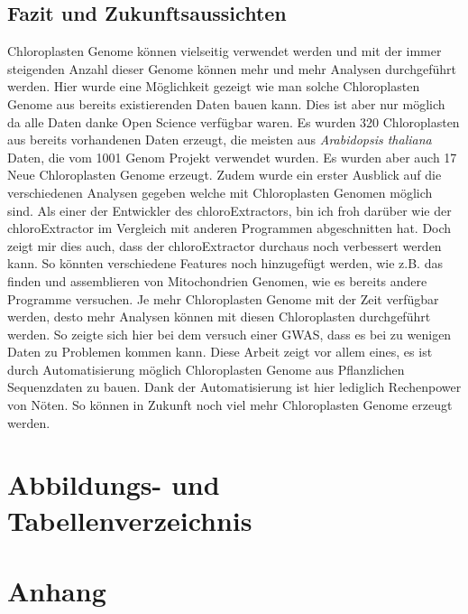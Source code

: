 \documentclass{scrartcl}
\begin{document}
\subsection{Fazit und Zukunftsaussichten}
\label{sec-5-8}
Chloroplasten Genome können vielseitig verwendet werden und mit der immer steigenden Anzahl dieser Genome können mehr und mehr Analysen durchgeführt werden. Hier wurde eine Möglichkeit gezeigt wie man solche Chloroplasten Genome
aus bereits existierenden Daten bauen kann. Dies ist aber nur möglich da alle Daten danke Open Science verfügbar waren. Es wurden 320 Chloroplasten aus bereits vorhandenen Daten erzeugt, die meisten aus \emph{Arabidopsis thaliana}
Daten, die vom 1001 Genom Projekt verwendet wurden. Es wurden aber auch 17 Neue Chloroplasten Genome erzeugt. Zudem wurde ein erster Ausblick auf die verschiedenen Analysen gegeben welche mit Chloroplasten Genomen möglich sind.
Als einer der Entwickler des chloroExtractors, bin ich froh darüber wie der chloroExtractor im Vergleich mit anderen Programmen abgeschnitten hat. Doch zeigt mir dies auch, dass der chloroExtractor durchaus noch verbessert 
werden kann.
So könnten verschiedene Features noch hinzugefügt werden, wie z.B. das finden und assemblieren von Mitochondrien Genomen, wie es bereits andere Programme versuchen. Je mehr Chloroplasten Genome mit der Zeit verfügbar werden, desto 
mehr Analysen können mit diesen Chloroplasten durchgeführt werden. So zeigte sich hier bei dem versuch einer GWAS, dass es bei zu wenigen Daten zu Problemen kommen kann. 
Diese Arbeit zeigt vor allem eines, es ist durch Automatisierung möglich Chloroplasten Genome aus Pflanzlichen Sequenzdaten zu bauen. Dank der Automatisierung ist hier lediglich Rechenpower von Nöten. So können in Zukunft
noch viel mehr Chloroplasten Genome erzeugt werden.
\section{Abbildungs- und Tabellenverzeichnis}
\label{sec-6}
\listoffigures

\listoftables
\clearpage
\section{Anhang}
\label{sec-7}
\end{document}
